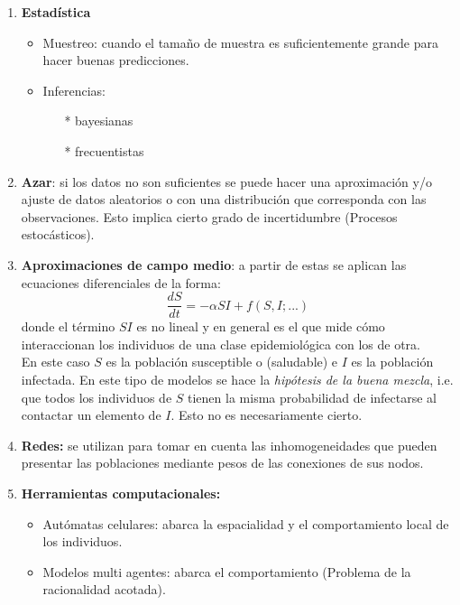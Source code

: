 \documentclass[10pt,oneside]{article}
\begin{document}
\begin{multicols}{2}
    \begin{enumerate}
        \item \textbf{Estadística}
        \begin{itemize}
            \item Muestreo: cuando el tamaño de muestra es suficientemente grande para hacer buenas predicciones.
            \item Inferencias:
            \begin{itemize}
                \item[*] bayesianas
                \item[*] frecuentistas
            \end{itemize}
        \end{itemize}
        \item \textbf{Azar}: si los datos no son suficientes se puede hacer una aproximación y/o ajuste de datos aleatorios o con una distribución que corresponda con las observaciones. Esto implica cierto grado de incertidumbre (Procesos estocásticos).
        \item \textbf{Aproximaciones de campo medio}: a partir de estas se aplican las ecuaciones diferenciales de la forma:
        $$\frac{dS}{dt}=-\alpha SI+ f(S,I;...)$$
        donde el término $SI$ es no lineal y en general es el que mide cómo interaccionan los individuos de una clase epidemiológica con los de otra. \\ \newline En este caso $S$ es la población susceptible o (saludable) e $I$ es la población infectada. En este tipo de modelos se hace la \textit{hipótesis de la buena mezcla}, i.e. que todos los individuos de $S$ tienen la misma probabilidad de infectarse al contactar un elemento de $I$. Esto no es necesariamente cierto.
        \item \textbf{Redes:} se utilizan para tomar en cuenta las inhomogeneidades que pueden presentar las poblaciones mediante pesos de las conexiones de sus nodos.
        \item \textbf{Herramientas computacionales:}
        \begin{itemize}
            \item Autómatas celulares: abarca la espacialidad y el comportamiento local de los individuos.
            \item Modelos multi agentes: abarca el comportamiento (Problema de la racionalidad acotada).
        \end{itemize}
    \end{enumerate}
    

\end{multicols}
\end{document}
